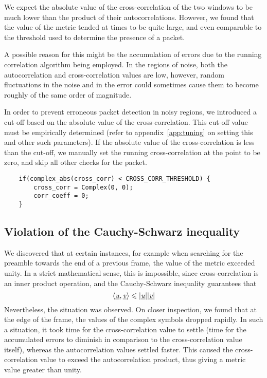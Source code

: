We expect the absolute value of the cross-correlation of the two windows to be
much lower than the product of their autocorrelations. However, we found that
the value of the metric tended at times to be quite large, and even comparable
to the threshold used to determine the presence of a packet.

A possible reason for this might be the accumulation of errors due to the
running correlation algorithm being employed. In the regions of noise, both the
autocorrelation and cross-correlation values are low, however, random
fluctuations in the noise and in the error could sometimes cause them to become
roughly of the same order of magnitude.

In order to prevent erroneous packet detection in noisy regions, we introduced
a cut-off based on the absolute value of the cross-correlation. This cut-off
value must be empirically determined (refer to appendix~\ref{app:tuning} on
setting this and other such parameters). If the absolute value of the
cross-correlation is less than the cut-off, we manually set the running
cross-correlation at the point to be zero, and skip all other checks for the
packet.

\begin{lstlisting}
	if(complex_abs(cross_corr) < CROSS_CORR_THRESHOLD) {
		cross_corr = Complex(0, 0);
		corr_coeff = 0;
	}
\end{lstlisting}

\subsection{Violation of the Cauchy-Schwarz inequality}
\label{subsec:cs-violation}

We discovered that at certain instances, for example when searching for the
preamble towards the end of a previous frame, the value of the metric exceeded
unity. In a strict mathematical sense, this is impossible, since
cross-correlation is an inner product operation, and the Cauchy-Schwarz
inequality guarantees that
$$ \langle \underbar{\emph{u}}, \underbar{\emph{v}} \rangle \leqslant |\underbar{\emph{u}}||\underbar{\emph{v}}| $$
Nevertheless, the situation was observed. On closer inspection, we found that
at the edge of the frame, the values of the complex symbols dropped rapidly. In
such a situation, it took time for the cross-correlation value to settle (time
for the accumulated errors to diminish in comparison to the cross-correlation
value itself), whereas the autocorrelation values settled faster. This caused
the cross-correlation value to exceed the autocorrelation product, thus giving
a metric value greater than unity.

